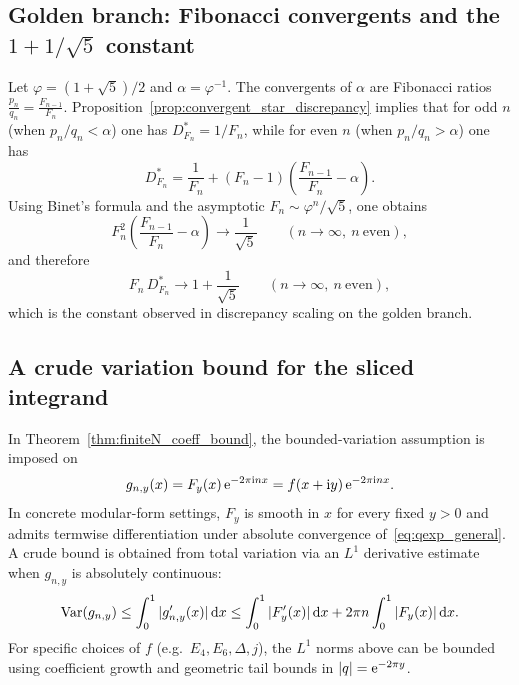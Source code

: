 \subsection{Golden branch: Fibonacci convergents and the \texorpdfstring{$1+1/\sqrt{5}$}{1+1/sqrt(5)} constant}
\label{app:golden_constant}

Let $\varphi=(1+\sqrt{5})/2$ and $\alpha=\varphi^{-1}$. The convergents of $\alpha$ are Fibonacci ratios $\frac{p_n}{q_n}=\frac{F_{n-1}}{F_n}$.
Proposition~\ref{prop:convergent_star_discrepancy} implies that for odd $n$ (when $p_n/q_n<\alpha$) one has $D_{F_n}^*=1/F_n$, while for even $n$ (when $p_n/q_n>\alpha$) one has
\begin{equation}
D_{F_n}^*=\frac{1}{F_n}+(F_n-1)\!\left(\frac{F_{n-1}}{F_n}-\alpha\right).
\end{equation}
Using Binet's formula and the asymptotic $F_n\sim \varphi^n/\sqrt{5}$, one obtains
\begin{equation}
F_n^2\left(\frac{F_{n-1}}{F_n}-\alpha\right)\to \frac{1}{\sqrt{5}}
\qquad (n\to\infty,\ n\ \mathrm{even}),
\end{equation}
and therefore
\begin{equation}
F_n\,D_{F_n}^*\to 1+\frac{1}{\sqrt{5}}
\qquad (n\to\infty,\ n\ \mathrm{even}),
\end{equation}
which is the constant observed in discrepancy scaling on the golden branch.

\subsection{A crude variation bound for the sliced integrand}
\label{app:variation_bound_gny}

In Theorem~\ref{thm:finiteN_coeff_bound}, the bounded-variation assumption is imposed on
\begin{equation}
g_{n,y}(x)=F_y(x)\,\mathrm{e}^{-2\pi\mathrm{i} n x}=f(x+\mathrm{i} y)\,\mathrm{e}^{-2\pi\mathrm{i} n x}.
\end{equation}
In concrete modular-form settings, $F_y$ is smooth in $x$ for every fixed $y>0$ and admits termwise differentiation under absolute convergence of~\eqref{eq:qexp_general}. A crude bound is obtained from total variation via an $L^1$ derivative estimate when $g_{n,y}$ is absolutely continuous:
\begin{equation}
\mathrm{Var}(g_{n,y})\le \int_0^1 |g_{n,y}'(x)|\,\mathrm{d} x
\le \int_0^1 |F_y'(x)|\,\mathrm{d} x + 2\pi n \int_0^1 |F_y(x)|\,\mathrm{d} x.
\end{equation}
For specific choices of $f$ (e.g.\ $E_4,E_6,\Delta,j$), the $L^1$ norms above can be bounded using coefficient growth and geometric tail bounds in $|q|=\mathrm{e}^{-2\pi y}$.

